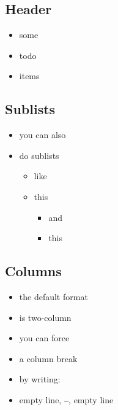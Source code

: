 \documentclass[11pt,letterpaper]{article}
\begin{document}
\begin{multicols*}{2}

\subsection*{Header}
\begin{itemize}
    \item some
    \item todo
    \item items
\end{itemize}

\subsection*{Sublists}
\begin{itemize}
    \item you can also
    \item do sublists
    \begin{itemize}
        \item like
        \item this
        \begin{itemize}
            \item and
            \item this
        \end{itemize}
    \end{itemize}
\end{itemize}

\subsection*{Columns}
\begin{itemize}
    \item the default format
    \item is two-column
    \item you can force
    \item a column break
    \item by writing:
    \item empty line, \texttt{---}, empty line
\end{itemize}

\vfill\null\columnbreak


\end{multicols*}
\end{document}
